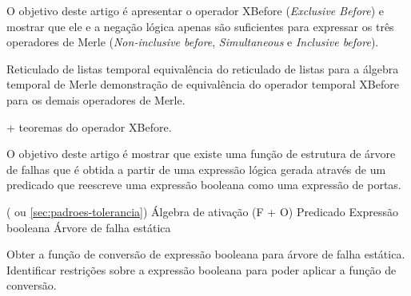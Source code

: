 \documentclass[a5paper,portuges]{article}
\begin{document}
\begin{artigo}
\label{art:xbefore}
\begin{objetivo}
O objetivo deste artigo é apresentar o operador XBefore (\emph{Exclusive Before}) e mostrar que ele e a negação lógica apenas são suficientes para expressar os três operadores de Merle (\emph{Non-inclusive before}, \emph{Simultaneous} e \emph{Inclusive before}).
\end{objetivo}

\begin{fluxo}
Reticulado de listas temporal \passofluxo equivalência do reticulado de listas para a álgebra temporal de Merle \passofluxo demonstração de equivalência do operador temporal XBefore para os demais operadores de Merle.
\end{fluxo}

\begin{paraconseguir}
 + teoremas do operador XBefore. 
\end{paraconseguir}

\begin{submissao}
  \item 
\end{submissao}
\end{artigo}

\begin{artigo}

\begin{objetivo}
O objetivo deste artigo é mostrar que existe uma função de estrutura de árvore de falhas que é obtida a partir de uma expressão lógica gerada através de um predicado que reescreve uma expressão booleana como uma expressão de portas.
\end{objetivo}

\begin{fluxo}
( ou \cref{sec:padroes-tolerancia}) \passofluxo Álgebra de ativação (F + O) \passofluxo Predicado \passofluxo Expressão booleana \passofluxo Árvore de falha estática
\end{fluxo}

\begin{paraconseguir}
Obter a função de conversão de expressão booleana para árvore de falha estática. Identificar restrições sobre a expressão booleana para poder aplicar a função de conversão. 
\end{paraconseguir}

\begin{submissao}
  \item 
\end{submissao}


\end{artigo}
\end{document}
